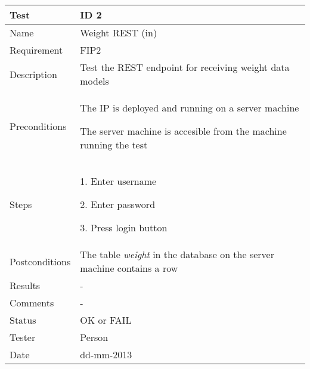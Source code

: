 \begin{table}
\begin{center}
\begin{tabular}{ | l | p{10cm} | }
	\hline
	\textbf{Test}	&	\textbf{ID 2} \\
	\hline\noalign{\smallskip}\noalign{\smallskip}\hline
	Name				& Weight REST (in) \\
	Requirement			& FIP2 \\
	Description			& Test the REST endpoint for receiving weight data models \\
	Preconditions		&	\par The IP is deployed and running on a server machine
							\par The server machine is accesible from the machine running the test \\
	Steps 				&	\par 1. Enter username
							\par 2. Enter password
							\par 3. Press login button \\
	Postconditions		& The table \textit{weight} in the database on the server machine contains a row \\
	Results				& - \\
	Comments			& - \\
	Status				& OK or FAIL \\
	Tester				& Person \\
	Date				& dd-mm-2013 \\
	\hline
\end{tabular}
\end{center}
\end{table}

